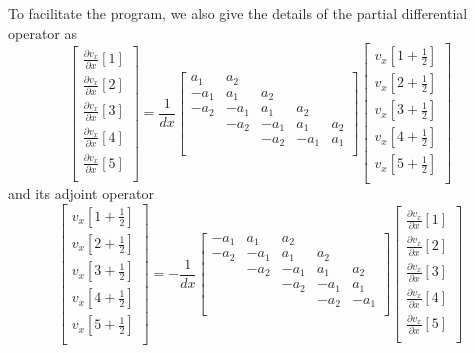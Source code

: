 \documentclass[revised,endfloat]{geophysics}
\begin{document}
To facilitate the program, we also give the details of the partial differential operator as
\begin{equation}
\begin{bmatrix}
\frac{\partial v_x}{\partial x}[1] \\
\frac{\partial v_x}{\partial x}[2] \\
\frac{\partial v_x}{\partial x}[3] \\
\frac{\partial v_x}{\partial x}[4] \\
\frac{\partial v_x}{\partial x}[5] \\
\end{bmatrix}
= \frac{1}{dx} \begin{bmatrix}
a_1 & a_2 & & &\\
-a_1& a_1 & a_2 & & \\
-a_2& -a_1 & a_1 & a_2 & \\
& -a_2 & -a_1 & a_1 & a_2 \\
& & -a_2 & -a_1 & a_1 \\
\end{bmatrix}
\begin{bmatrix}
v_x[1+\frac{1}{2}] \\
v_x[2+\frac{1}{2}] \\
v_x[3+\frac{1}{2}] \\
v_x[4+\frac{1}{2}] \\
v_x[5+\frac{1}{2}] \\
\end{bmatrix}
\label{eq37}
\end{equation}
and its adjoint operator
\begin{equation}
\begin{bmatrix}
v_x[1+\frac{1}{2}] \\
v_x[2+\frac{1}{2}] \\
v_x[3+\frac{1}{2}] \\
v_x[4+\frac{1}{2}] \\
v_x[5+\frac{1}{2}] \\
\end{bmatrix}
= - \frac{1}{dx} \begin{bmatrix}
-a_1 & a_1 & a_2 & & \\
-a_2 & -a_1 & a_1 & a_2 &   \\
& -a_2 & -a_1 & a_1 & a_2  \\
& & -a_2 & -a_1 & a_1  \\
& & & -a_2 & -a_1  \\
\end{bmatrix}
\begin{bmatrix}
\frac{\partial v_x}{\partial x}[1] \\
\frac{\partial v_x}{\partial x}[2] \\
\frac{\partial v_x}{\partial x}[3] \\
\frac{\partial v_x}{\partial x}[4] \\
\frac{\partial v_x}{\partial x}[5] \\
\end{bmatrix}
\label{eq38}
\end{equation}
\end{document}
